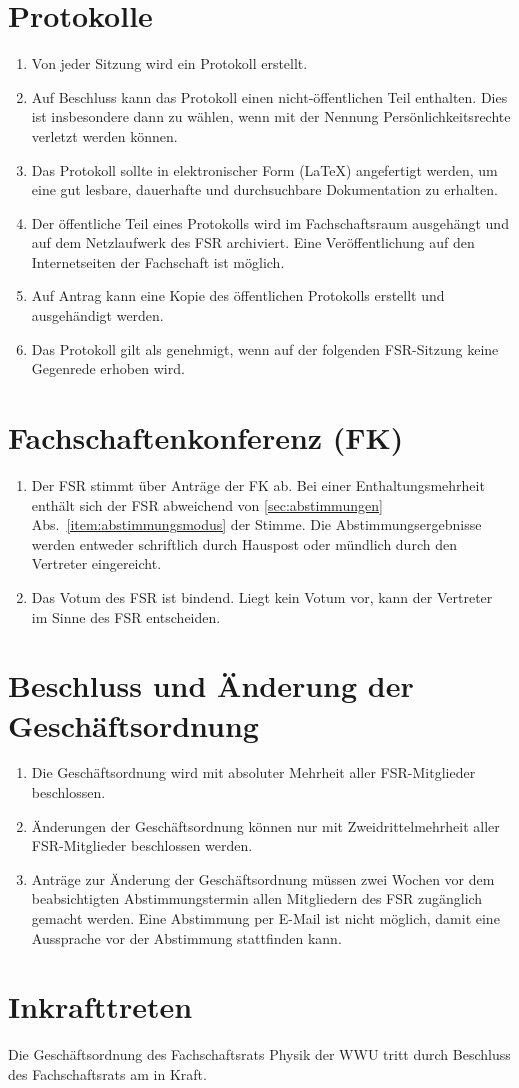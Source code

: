 \documentclass[
	a4paper,
	12pt,
	oneside,
	parskip=half-,
	pagesize,
	headsepline,
	german,
	ngerman
]{scrartcl}
\begin{document}
\section{Protokolle}
\label{sec:protokolle}
\begin{enumerate}
	\item Von jeder Sitzung wird ein Protokoll erstellt.
	\item Auf Beschluss kann das Protokoll einen nicht-öffentlichen Teil enthalten. Dies ist insbesondere dann zu wählen, wenn mit der Nennung Persönlichkeitsrechte verletzt werden können.
	\item Das Protokoll sollte in elektronischer Form (\LaTeX) angefertigt werden, um eine gut lesbare, dauerhafte und durchsuchbare Dokumentation zu erhalten.
	\item Der öffentliche Teil eines Protokolls wird im Fachschaftsraum ausgehängt und auf dem Netzlaufwerk des FSR archiviert. Eine Veröffentlichung auf den Internetseiten der Fachschaft ist möglich.
	\item Auf Antrag kann eine Kopie des öffentlichen Protokolls erstellt und ausgehändigt werden.
	\item Das Protokoll gilt als genehmigt, wenn auf der folgenden FSR-Sitzung keine Gegenrede erhoben wird.
\end{enumerate}





\section{Fachschaftenkonferenz (FK)}
 \begin{enumerate}
  \item Der FSR stimmt über Anträge der FK ab. Bei einer Enthaltungsmehrheit enthält sich der FSR abweichend von \ref{sec:abstimmungen} Abs.\ \ref{item:abstimmungsmodus} der Stimme. Die Abstimmungsergebnisse werden entweder schriftlich durch Hauspost oder mündlich durch den Vertreter eingereicht.  
  \item Das Votum des FSR ist bindend. Liegt kein Votum vor, kann der Vertreter im Sinne des FSR entscheiden.
 \end{enumerate}

\section{Beschluss und Änderung der Geschäftsordnung} \label{sec:GO-Änderung}
\begin{enumerate}
	\item Die Geschäftsordnung wird mit absoluter Mehrheit aller FSR-Mitglieder beschlossen.
	\item Änderungen der Geschäftsordnung können nur mit Zweidrittelmehrheit aller FSR-Mitglieder beschlossen werden.
	\item Anträge zur Änderung der Geschäftsordnung müssen zwei Wochen vor dem beabsichtigten Abstimmungstermin allen Mitgliedern des FSR zugänglich gemacht werden. Eine Abstimmung per E-Mail ist nicht möglich, damit eine Aussprache vor der Abstimmung stattfinden kann.
\end{enumerate}

\section{Inkrafttreten}
Die Geschäftsordnung des Fachschaftsrats Physik der WWU tritt durch Beschluss des Fachschaftsrats am  in Kraft.
\end{document}
